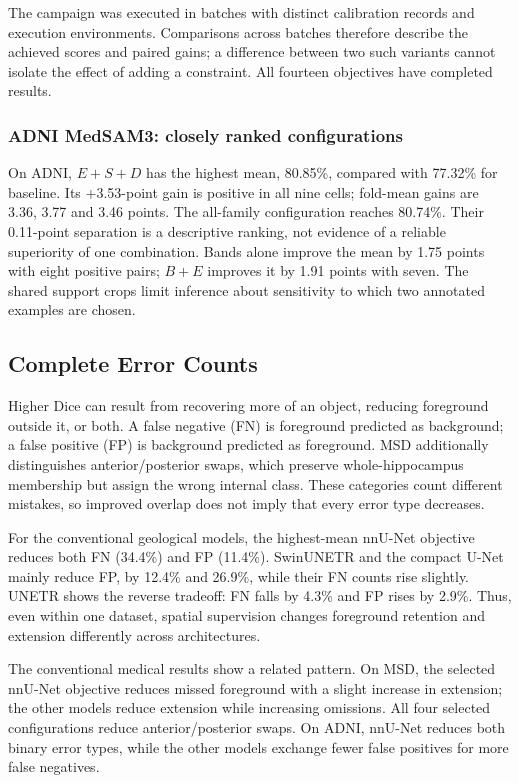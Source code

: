 \documentclass[12pt,a4paper]{article}
\begin{document}
The campaign was executed in batches with distinct calibration records
and execution environments. Comparisons across batches therefore
describe the achieved scores and paired gains; a difference between two
such variants cannot isolate the effect of adding a constraint.
All fourteen objectives have completed results.

\subsubsection*{ADNI MedSAM3: closely ranked configurations}

On ADNI, $E+S+D$ has the highest mean, 80.85\%, compared with 77.32\%
for baseline. Its +3.53-point gain is positive in all nine cells;
fold-mean gains are 3.36, 3.77 and 3.46 points. The all-family
configuration reaches 80.74\%. Their 0.11-point separation is a
descriptive ranking, not evidence of a reliable superiority of one
combination. Bands alone improve the mean by 1.75 points with eight
positive pairs; $B+E$ improves it by 1.91 points with seven. The
shared support crops limit inference about sensitivity to which two
annotated examples are chosen.

\FloatBarrier

\subsection{Complete Error Counts}\label{sec:complete-error-tables}

\label{sec:error-details}


Higher Dice can result from recovering more of an object, reducing
foreground outside it, or both. A false negative (FN) is foreground
predicted as background; a false positive (FP) is background predicted as
foreground. MSD additionally distinguishes anterior/posterior swaps,
which preserve whole-hippocampus membership but assign the wrong internal
class. These categories count different mistakes, so improved overlap
does not imply that every error type decreases.

For the conventional geological models, the highest-mean nnU-Net objective
reduces both FN (34.4\%) and FP (11.4\%). SwinUNETR and the compact U-Net
mainly reduce FP, by 12.4\% and 26.9\%, while their FN counts rise
slightly. UNETR shows the reverse tradeoff: FN falls by 4.3\% and FP
rises by 2.9\%. Thus, even within one dataset, spatial supervision changes
foreground retention and extension differently across architectures.

The conventional medical results show a related pattern. On MSD, the
selected nnU-Net objective reduces missed foreground with a slight
increase in extension; the other models reduce extension while increasing
omissions. All four selected configurations reduce anterior/posterior
swaps. On ADNI, nnU-Net reduces both binary error types, while the other
models exchange fewer false positives for more false negatives.
\end{document}
